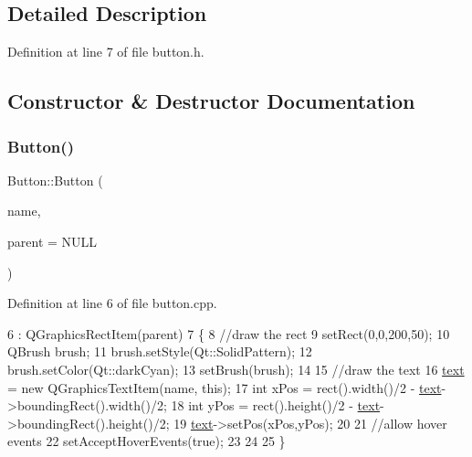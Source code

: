 \subsection{Detailed Description}


Definition at line 7 of file button.\+h.



\subsection{Constructor \& Destructor Documentation}
\mbox{\label{class_button_a69976e5c00874a3807b642f249c1c776}} 
\subsubsection{\texorpdfstring{Button()}{Button()}}
{\footnotesize\ttfamily Button\+::\+Button (\begin{DoxyParamCaption}\item[{Q\+String}]{name,  }\item[{Q\+Graphics\+Item $\ast$}]{parent = {\ttfamily NULL} }\end{DoxyParamCaption})}



Definition at line 6 of file button.\+cpp.


\begin{DoxyCode}
6                                                  : QGraphicsRectItem(parent)
7 \{
8     \textcolor{comment}{//draw the rect}
9     setRect(0,0,200,50);
10     QBrush brush;
11     brush.setStyle(Qt::SolidPattern);
12     brush.setColor(Qt::darkCyan);
13     setBrush(brush);
14 
15     \textcolor{comment}{//draw the text}
16     \hyperlink{class_button_a0d566bacc8c1befef9d09b839b6e76e6}{text} = \textcolor{keyword}{new} QGraphicsTextItem(name, \textcolor{keyword}{this});
17     \textcolor{keywordtype}{int} xPos = rect().width()/2 - \hyperlink{class_button_a0d566bacc8c1befef9d09b839b6e76e6}{text}->boundingRect().width()/2;
18     \textcolor{keywordtype}{int} yPos = rect().height()/2 - \hyperlink{class_button_a0d566bacc8c1befef9d09b839b6e76e6}{text}->boundingRect().height()/2;
19     \hyperlink{class_button_a0d566bacc8c1befef9d09b839b6e76e6}{text}->setPos(xPos,yPos);
20 
21     \textcolor{comment}{//allow hover events}
22     setAcceptHoverEvents(\textcolor{keyword}{true});
23 
24 
25 \}
\end{DoxyCode}


